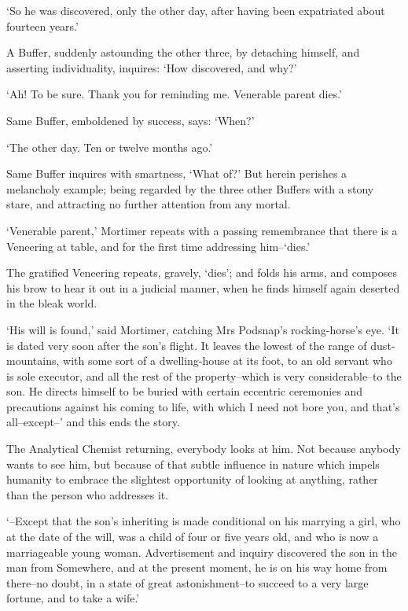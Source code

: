 ‘So he was discovered, only the other day, after having been expatriated
about fourteen years.’

A Buffer, suddenly astounding the other three, by detaching himself, and
asserting individuality, inquires: ‘How discovered, and why?’

‘Ah! To be sure. Thank you for reminding me. Venerable parent dies.’

Same Buffer, emboldened by success, says: ‘When?’

‘The other day. Ten or twelve months ago.’

Same Buffer inquires with smartness, ‘What of?’ But herein perishes a
melancholy example; being regarded by the three other Buffers with a
stony stare, and attracting no further attention from any mortal.

‘Venerable parent,’ Mortimer repeats with a passing remembrance that
there is a Veneering at table, and for the first time addressing
him--‘dies.’

The gratified Veneering repeats, gravely, ‘dies’; and folds his arms,
and composes his brow to hear it out in a judicial manner, when he finds
himself again deserted in the bleak world.

‘His will is found,’ said Mortimer, catching Mrs Podsnap’s
rocking-horse’s eye. ‘It is dated very soon after the son’s flight. It
leaves the lowest of the range of dust-mountains, with some sort of a
dwelling-house at its foot, to an old servant who is sole executor, and
all the rest of the property--which is very considerable--to the son.
He directs himself to be buried with certain eccentric ceremonies and
precautions against his coming to life, with which I need not bore you,
and that’s all--except--’ and this ends the story.

The Analytical Chemist returning, everybody looks at him. Not because
anybody wants to see him, but because of that subtle influence in nature
which impels humanity to embrace the slightest opportunity of looking at
anything, rather than the person who addresses it.

‘--Except that the son’s inheriting is made conditional on his marrying
a girl, who at the date of the will, was a child of four or five years
old, and who is now a marriageable young woman. Advertisement and
inquiry discovered the son in the man from Somewhere, and at the present
moment, he is on his way home from there--no doubt, in a state of great
astonishment--to succeed to a very large fortune, and to take a wife.’

